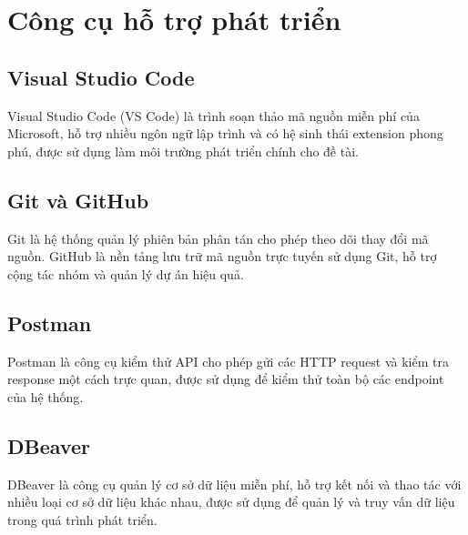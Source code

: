 \section{Công cụ hỗ trợ phát triển}

\subsection{Visual Studio Code}
Visual Studio Code (VS Code) là trình soạn thảo mã nguồn miễn phí của Microsoft, hỗ trợ nhiều ngôn ngữ lập trình và có hệ sinh thái extension phong phú, được sử dụng làm môi trường phát triển chính cho đề tài.

\subsection{Git và GitHub}
Git là hệ thống quản lý phiên bản phân tán cho phép theo dõi thay đổi mã nguồn. GitHub là nền tảng lưu trữ mã nguồn trực tuyến sử dụng Git, hỗ trợ cộng tác nhóm và quản lý dự án hiệu quả.

\subsection{Postman}
Postman là công cụ kiểm thử API cho phép gửi các HTTP request và kiểm tra response một cách trực quan, được sử dụng để kiểm thử toàn bộ các endpoint của hệ thống.

\subsection{DBeaver}
DBeaver là công cụ quản lý cơ sở dữ liệu miễn phí, hỗ trợ kết nối và thao tác với nhiều loại cơ sở dữ liệu khác nhau, được sử dụng để quản lý và truy vấn dữ liệu trong quá trình phát triển.

